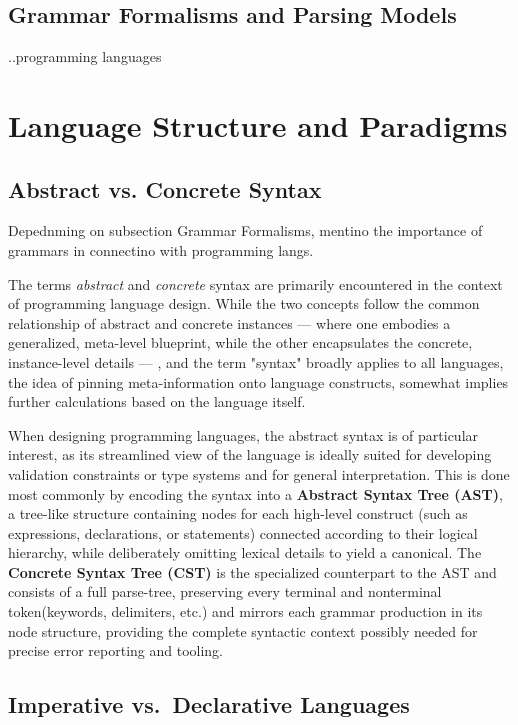 \documentclass[11pt]{report}
\begin{document}
\subsection{Grammar Formalisms and Parsing Models}
..programming languages

\section{Language Structure and Paradigms}
\subsection{Abstract vs. Concrete Syntax}
Depednming on subsection Grammar Formalisms, mentino the importance of grammars in connectino with programming langs.

The terms \textit{abstract} and \textit{concrete} syntax are primarily encountered in the context of programming language design. While the two concepts follow the common relationship of
abstract and concrete instances — where one embodies a generalized, meta-level blueprint, while the other encapsulates the concrete, instance-level details — , and the term "syntax" broadly applies to all languages,
the idea of pinning meta-information onto language constructs, somewhat implies further calculations based on the language itself.


When designing programming languages, the abstract syntax is of particular interest, as its streamlined view of the language is ideally suited for developing 
validation constraints or type systems and for general interpretation. This is done most commonly by encoding the syntax into a \textbf{Abstract Syntax Tree (AST)}, 
a tree-like structure containing nodes for each high-level construct (such as expressions, declarations, or statements) connected according to their logical hierarchy, 
while deliberately omitting lexical details to yield a canonical. \cite{slonneger1995specifying}
The \textbf{Concrete Syntax Tree (CST)} is the specialized counterpart to the AST and consists of a full parse-tree, preserving every terminal and nonterminal 
token(keywords, delimiters, etc.) and mirrors each grammar production in its node structure, providing the complete syntactic context possibly needed for precise error 
reporting and tooling. \cite{aho2006compilers}

\subsection{Imperative vs.\ Declarative Languages}
\end{document}
